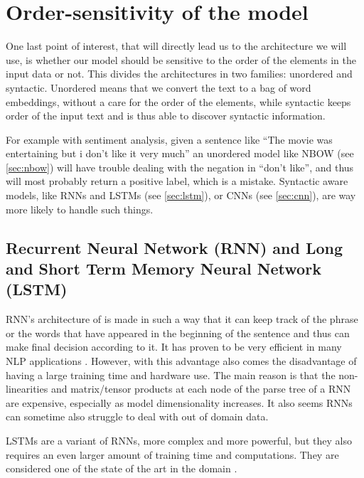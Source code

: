 \section{Order-sensitivity of the model}
One last point of interest, that will directly lead us to the architecture we will use, is whether our model should be sensitive to the order of the elements in the input data or not. This divides the architectures in two families: unordered and syntactic. Unordered means that we convert the text to a bag of word embeddings, without a care for the order of the elements, while syntactic keeps order of the input text and is thus able to discover syntactic information.

For example with sentiment analysis, given a sentence like “The movie was entertaining but i don't like it very much” an unordered model like NBOW (see \autoref{sec:nbow}) will have trouble dealing with the negation in “don't like”, and thus will most probably return a positive label, which is a mistake. Syntactic aware models, like RNNs and LSTMs (see \autoref{sec:lstm}), or CNNs (see \autoref{sec:cnn}), are way more likely to handle such things.

\subsection{Recurrent Neural Network (RNN) and Long and Short Term Memory Neural Network (LSTM)\label{sec:lstm}}
RNN’s architecture of is made in such a way that it can keep track of the phrase or the words  that have appeared in the beginning of the sentence and thus can make final decision according to it. It has proven to be very efficient in many NLP applications \cite{rnn_attention_lanl,UnreasonableRNN}.
However, with this advantage also comes the disadvantage of having a large training time and hardware use.
The main reason is that the non-linearities and matrix/tensor products at each node of the parse tree of a RNN are expensive, especially as model dimensionality increases. 
It also seems RNNs can sometime also struggle to deal with out of domain data.

LSTMs are a variant of RNNs, more complex and more powerful, but they also requires an even larger amount of training time and computations.
They are considered one of the state of the art in the domain \cite{LSTM}.

